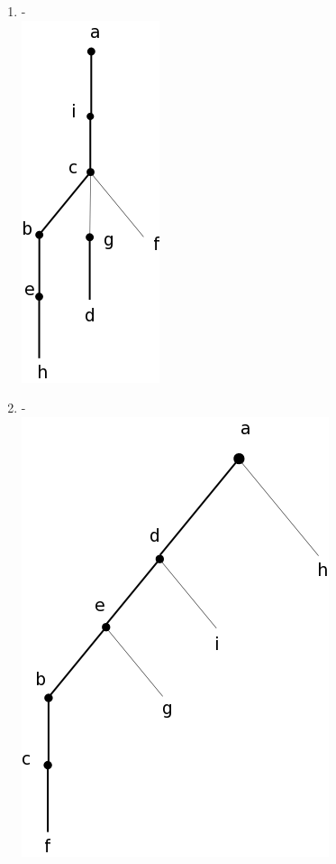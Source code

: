 \documentclass[a4paper, 11pt]{article}
\begin{document}
\begin{enumerate}
    \item -\\ \includegraphics[scale=0.3]{reponse3.png}
    \item -\\ \includegraphics[scale=0.3]{reponse4.png}

\end{enumerate}
\end{document}
